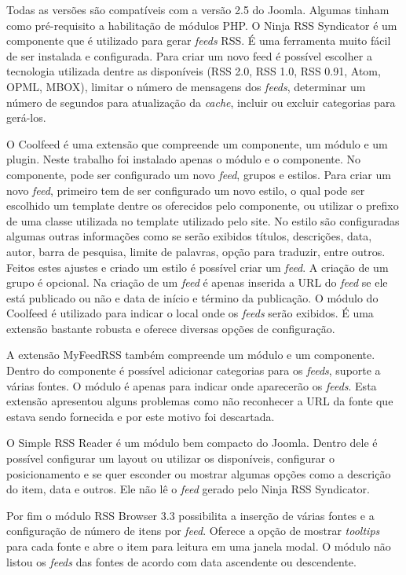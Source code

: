 Todas as versões são compatíveis com a versão 2.5 do Joomla. Algumas tinham como pré-requisito a habilitação de módulos PHP.
O Ninja RSS Syndicator é um componente que é utilizado para gerar \emph{feeds} RSS. É uma ferramenta muito fácil de ser instalada e configurada. Para criar um novo feed é possível escolher a tecnologia utilizada dentre as disponíveis (RSS 2.0, RSS 1.0, RSS 0.91, Atom, OPML, MBOX), limitar o número de mensagens dos \emph{feeds}, determinar um número de segundos para atualização da \emph{cache}, incluir ou excluir categorias para gerá-los.

O Coolfeed é uma extensão que compreende um componente, um módulo e um plugin. Neste trabalho foi instalado apenas o módulo e o componente. No componente, pode ser configurado um novo \emph{feed}, grupos e estilos. Para criar um novo \emph{feed}, primeiro tem de ser configurado um novo estilo, o qual pode ser escolhido um template dentre os oferecidos pelo componente, ou utilizar o prefixo de uma classe utilizada no template utilizado pelo site. No estilo são configuradas algumas outras informações como se serão exibidos títulos, descrições, data, autor, barra de pesquisa, limite de palavras, opção para traduzir, entre outros. Feitos estes ajustes e criado um estilo é possível criar um \emph{feed}. A criação de um grupo é opcional. Na criação de um \emph{feed} é apenas inserida a URL do \emph{feed} se ele está publicado ou não e data de início e término da publicação. O módulo do Coolfeed é utilizado para indicar o local onde os \emph{feeds} serão exibidos. É uma extensão bastante robusta e oferece diversas opções de configuração.

A extensão MyFeedRSS também compreende um módulo e um componente. Dentro do componente é possível adicionar categorias para os \emph{feeds}, suporte a várias fontes. O módulo é apenas para indicar onde aparecerão os \emph{feeds}. Esta extensão apresentou alguns problemas como não reconhecer a URL da fonte que estava sendo fornecida e por este motivo foi descartada.

O Simple RSS Reader é um módulo bem compacto do Joomla. Dentro dele é possível configurar um layout ou utilizar os disponíveis, configurar o posicionamento e se quer esconder ou mostrar algumas opções como a descrição do item, data e outros. Ele não lê o \emph{feed} gerado pelo Ninja RSS Syndicator.

Por fim o módulo RSS Browser 3.3 possibilita a inserção de várias fontes e a configuração de número de itens por \emph{feed}. Oferece a opção de mostrar \emph{tooltips} para cada fonte e abre o item para leitura em uma janela modal. O módulo não listou os \emph{feeds} das fontes de acordo com data ascendente ou descendente.


